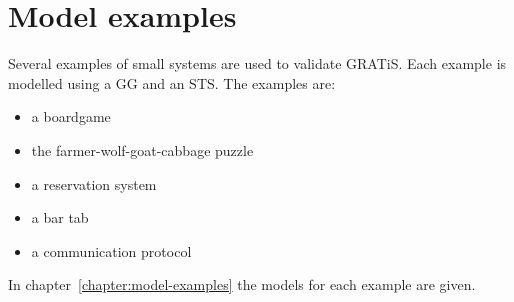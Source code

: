 \section{Model examples}\label{sec:model-examples}

Several examples of small systems are used to validate GRATiS. Each example is modelled using a GG and an STS. The examples are:
\begin{itemize}
\item a boardgame
\item the farmer-wolf-goat-cabbage puzzle
\item a reservation system
\item a bar tab
\item a communication protocol
\end{itemize}

In chapter~\ref{chapter:model-examples} the models for each example are given.
